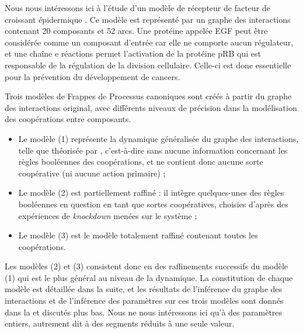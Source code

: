 Nous nous intéressons ici à l'étude d'un modèle de récepteur de facteur de croissant épidermique
\cite{Sahin09}.
Ce modèle est représenté par un graphe des interactions contenant 20 composants et 52 arcs.
Une protéine appelée EGF peut être considérée comme un composant d'entrée
car elle ne comporte aucun régulateur,
et une chaîne e réactions permet l'activation de la protéine pRB qui est responsable
de la régulation de la division cellulaire.
Celle-ci est donc essentielle pour la prévention du développement de cancers.

Trois modèles de Frappes de Processus canoniques
sont créés à partir du graphe des interactions original, avec différents niveaux
de précision dans la modélisation des coopérations entre composants.
\begin{itemize}
  \item Le modèle (1) représente la dynamique généralisée du graphe des interactions,
    telle que théorisée par ,
    c'est-à-dire sans aucune information concernant les règles booléennes des coopérations,
    et ne contient donc aucune sorte coopérative (ni aucune action primaire) ;
  \item Le modèle (2) est partiellement raffiné : il intègre quelques-unes des règles
    booléennes en question en tant que sortes coopératives,
    choisies d'après des expériences de \textit{knockdown} menées sur le système ;
  \item Le modèle (3) est le modèle totalement raffiné contenant toutes les coopérations.
\end{itemize}
Les modèles (2) et (3) consistent donc en des raffinements successifs du modèle (1)
qui est le plus général au niveau de la dynamique.
La constitution de chaque modèle est détaillée dans la suite,
et les résultats de l'inférence du graphe des interactions et de l'inférence des paramètres
sur ces trois modèles sont donnés dans la 
et discutés plus bas.
Nous ne nous intéressons ici qu'à des paramètres entiers,
autrement dit à des segments réduits à une seule valeur.

